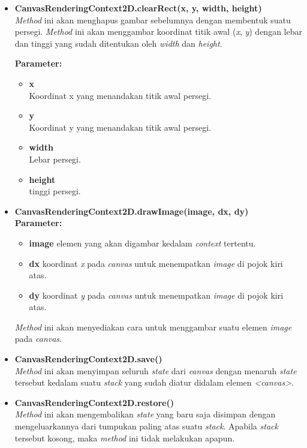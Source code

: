 \begin{itemize}
	\item \textbf{CanvasRenderingContext2D.clearRect(x, y, width, height)} \\ 
	\textit{Method} ini akan menghapus gambar sebelumnya dengan membentuk suatu persegi. \textit{Method} ini akan menggambar koordinat titik awal (\textit{x}, \textit{y}) dengan lebar dan tinggi yang sudah ditentukan oleh \textit{width} dan \textit{height}. 
	
	\textbf{Parameter:}
	\begin{itemize}
		\item \textbf{x} \\ Koordinat x yang menandakan titik awal persegi.
		\item \textbf{y} \\ Koordinat y yang menandakan titik awal persegi.
		\item \textbf{width} \\ Lebar persegi.
		\item \textbf{height} \\ tinggi persegi.
	\end{itemize}
%	
%	
	
	\item \textbf{CanvasRenderingContext2D.drawImage(image, dx, dy)} \\
	\textbf{Parameter:}
	\begin{itemize}
		\item \textbf{image} elemen yang akan digambar kedalam \textit{context} tertentu.
		\item \textbf{dx} koordinat \textit{x} pada \textit{canvas} untuk menempatkan \textit{image} di pojok kiri atas.
		\item \textbf{dy} koordinat \textit{y} pada \textit{canvas} untuk menempatkan \textit{image} di pojok kiri atas.
	\end{itemize}

	\textit{Method} ini akan menyediakan cara untuk menggambar suatu elemen \textit{image} pada \textit{canvas}.
	
	\item \textbf{CanvasRenderingContext2D.save()} \\ 
	\textit{Method} ini akan menyimpan seluruh \textit{state} dari \textit{canvas} dengan menaruh \textit{state} tersebut kedalam suatu \textit{stack} yang sudah diatur didalam elemen \textit{<canvas>}.
	
	\item \textbf{CanvasRenderingContext2D.restore()} \\
	\textit{Method} ini akan mengembalikan \textit{state} yang baru saja disimpan dengan mengeluarkannya dari tumpukan paling atas suatu \textit{stack}. Apabila \textit{stack} tersebut kosong, maka \textit{method} ini tidak melakukan apapun.
\end{itemize}

